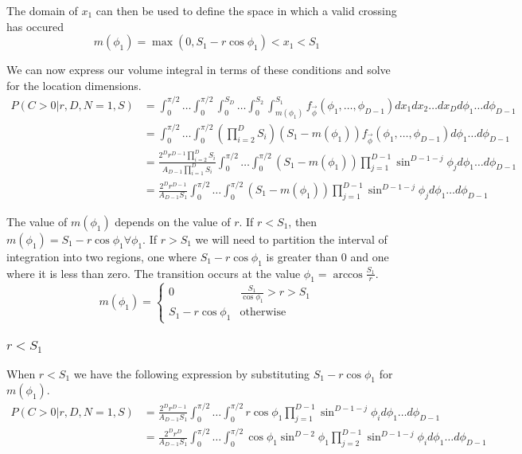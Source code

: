 \documentclass{article}
\begin{document}
The domain of $x_1$ can then be used to define the space in which a valid crossing has occured 
\begin{equation} \label{eq:crossing condition 0}
	m(\phi_1) = \max(0, S_1-r\cos{\phi_1}) < x_1 < S_1
\end{equation}

We can now express our volume integral in terms of these conditions and solve for the location dimensions.
\begin{align} \label{eq:volume integral}
	P(C>0|r, D, N=1, S) &= \int_0^{\pi/2} \hdots \int_0^{\pi/2} \int_0^{S_D} \hdots \int_0^{S_2} \int_{m(\phi_1)}^{S_1} f_{\vec\phi}(\phi_1,\hdots,\phi_{D-1})dx_1 dx_2 \hdots dx_D d\phi_1 \hdots d\phi_{D-1}\\
	&= \int_0^{\pi/2} \hdots \int_0^{\pi/2}\left(\prod_{i=2}^DS_i\right)\left(S_1-m(\phi_1)\right)  f_{\vec\phi}(\phi_1,\hdots,\phi_{D-1}) d\phi_1\hdots d\phi_{D-1} \\
	&= \frac{ 2^Dr^{D-1} \prod_{i=2}^DS_i}{A_{D-1}\prod_{i=1}^DS_i}\int_0^{\pi/2} \hdots \int_0^{\pi/2} (S_1-m(\phi_1)) \prod_{j=1}^{D-1}\sin^{D-1-j}\phi_j d\phi_1\hdots d\phi_{D-1}\\
	&= \frac{ 2^Dr^{D-1}}{A_{D-1}S_1}\int_0^{\pi/2} \hdots \int_0^{\pi/2} (S_1-m(\phi_1)) \prod_{j=1}^{D-1}\sin^{D-1-j}\phi_j d\phi_1\hdots d\phi_{D-1}
\end{align}

The value of $m(\phi_1)$ depends on the value of $r$. If $r<S_1$, then $m(\phi_1)=S_1-r\cos \phi_1 \forall \phi_1$. If $r>S_1$ we will need to partition the interval of integration into
two regions, one where $S_1-r\cos{\phi_1}$ is greater than 0 and one where it is less than zero. The transition occurs at the value $\phi_1 = \arccos{\frac{S_1}{r}}$.
\begin{equation}
	m(\phi_1) = \begin{cases}
		0 & \frac{S_1}{\cos\phi_1}>r>S_1\\
		S_1 - r\cos{\phi_1} & \text{otherwise}
	\end{cases}
\end{equation}

\subsubsection{$r<S_1$}
When $r<S_1$ we have the following expression by substituting $S_1 - r\cos{\phi_1}$ for $m(\phi_1)$.
\begin{align}
	P(C>0|r, D, N=1, S) &= \frac{ 2^Dr^{D-1} }{A_{D-1}S_1}\int_0^{\pi/2} \hdots \int_0^{\pi/2} r\cos\phi_1 \prod_{j=1}^{D-1}\sin^{D-1-j}\phi_i d\phi_1\hdots d\phi_{D-1}\\
	&= \frac{2^D r^D}{A_{D-1} S_1}\int_0^{\pi/2} \hdots \int_0^{\pi/2} \cos\phi_1\sin^{D-2}\phi_1 \prod_{j=2}^{D-1}\sin^{D-1-j}\phi_i d\phi_1\hdots d\phi_{D-1}
\end{align}
\end{document}
